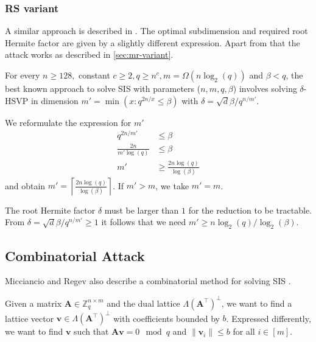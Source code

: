 \subsubsection{RS variant \cite{RS10}}

A similar approach is described in \cite{RS10}. The optimal subdimension and required root Hermite factor are given by a slightly different expression. Apart from that the attack works as described in \cref{sec:mr-variant}.

\begin{theorem}
  For every $n \geq 128,$ constant $c \geq 2, q \geq n^c, m = \Omega(n \log_2(q))$ and $\beta < q$, the best known approach to solve SIS with parameters ($n, m, q, \beta$) involves solving $\delta$-HSVP in dimension $m' = \min(x : q^{2n/x} \leq \beta)$ with $\delta = \sqrt{d}{\beta / q^{n/m'}}$.
\end{theorem}

We reformulate the expression for $m'$
\begin{align}
  q^{2n / m'}           & \leq \beta                          \\
  \frac{2n}{m' \log(q)} & \leq \beta                          \\
  m'                    & \geq \frac{2n \log(q)}{\log(\beta)}
\end{align}
and obtain $m' = \left\lceil \frac{2n \log(q)}{\log(\beta)} \right\rceil$. If $m' > m$, we take $m' = m$.

The root Hermite factor $\delta$ must be larger than $1$ for the reduction to be tractable. From $\delta = \sqrt{d}{\beta / q^{n/m'}} \geq 1$ it follows that we need $m' \geq n \log_2(q) / \log_2(\beta)$.



\subsection{Combinatorial Attack \cite{MR09}}
Micciancio and Regev also describe a combinatorial method for solving SIS \cite{MR09}.

Given a matrix $\mathbf{A} \in \mathbb{Z}_q^{n \times m}$ and the dual lattice $\Lambda(\mathbf{A}^\intercal)^{\perp}$, we want to find a lattice vector $\mathbf{v} \in \Lambda(\mathbf{A}^\intercal)^{\perp}$ with coefficients bounded by $b$. Expressed differently, we want to find $\mathbf{v}$ such that $\mathbf{A}\mathbf{v} = 0 \mod q$ and $\|\mathbf{v}_i\| \leq b$ for all $i \in [m]$.

